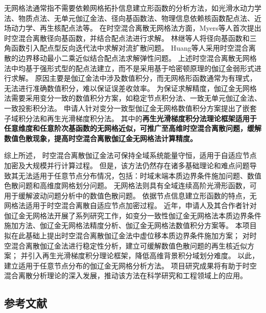 无网格法通常指不需要依赖网格拓扑信息建立形函数的分析方法，如光滑水动力学法\cite{Yang2019,Chang2011}、物质点法\cite{Kan2022}、无单元伽辽金法\cite{Wu2016d,Cheng2024}、径向基函数法\cite{jiang2025}、物理信息依赖核函数配点法\cite{FuZhuoJia2022}、近场动力学\cite{Gu2016,Zhang2022}、再生核配点法\cite{Hu2023}等。
在时空混合离散无网格法方面，Myers等人\cite{myers2002}首次提出时空混合离散径向基函数，并结合配点法进行求解。
林继等人\cite{lin2021}将径向基函数和三角函数引入配点型反向迭代法中求解对流扩散问题。
Huang等人\cite{huang2023}采用时空混合离散的边界移动最小二乘近似结合配点法求解弹性问题。
上述时空混合离散无网格法中均基于强形式型的配点法建立，而不是采用基于哈密顿原理的伽辽金弱形式进行求解。
原因主要是伽辽金法中涉及数值积分，而无网格形函数通常为有理式，无法进行准确数值积分，难以保证误差收敛率\cite{wu2021}。
为保证求解精度，伽辽金无网格法需要采用变分一致的数值积分方案\cite{Wu2016d}，如稳定节点积分法、一致无单元伽辽金法、一致投影积分法。
申请人针对变分一致型伽辽金无网格数值积分方案提出了嵌套子域积分法\cite{wang2016b}和再生光滑梯度积分法\cite{wang2019a}。
其中的\textbf{再生光滑梯度积分法理论框架适用于任意维度和任意阶次基函数的无网格近似，可推广至高维时空混合离散问题，缓解数值色散现象，提高时空混合离散伽辽金无网格法计算精度。}

综上所述，
时空混合离散伽辽金法可保持全域系统能量守恒，适用于自适应节点加密及大规模并行计算过程。
但是，该方法仍然存在诸多基础理论和难点问题导致其无法适用于任意节点分布情况，包括：时域末端本质边界条件施加问题、数值色散问题和高维度网格划分问题。
无网格法则具有全域连续高阶光滑形函数，可用于缓解波动问题分析中的数值色散问题。
依据节点信息建立形函数的特点，无网格法适用于时空混合离散自适应节点加密过程。
近年，申请人及其合作者针对伽辽金无网格法开展了系列研究工作，如变分一致性伽辽金无网格法本质边界条件施加方法\cite{Wu2022b,wu2023,wu2024}、伽辽金无网格法精度分析\cite{wu2021,wu2018a}、伽辽金无网格法数值积分方案\cite{Wu2016d,wang2016b,wang2019a}等。
本项目拟在此基础上提出时空混合离散伽辽金法中虚位移本质边界条件施加方案；
对时空混合离散伽辽金法进行稳定性分析，建立可缓解数值色散问题的再生核近似方案；
并引入再生光滑梯度积分理论框架，降低高维背景积分域划分难度。
以此，建立适用于任意节点分布的伽辽金无网格分析方法。
项目研究成果将有助于时空混合离散分析理论的深入发展，推动该方法在科学研究和工程领域上的应用。

\vspace{-5pt}

\begin{REF}
	\subsection*{参考文献}
	\vspace{-50pt}
	
\end{REF}

\newpage%
